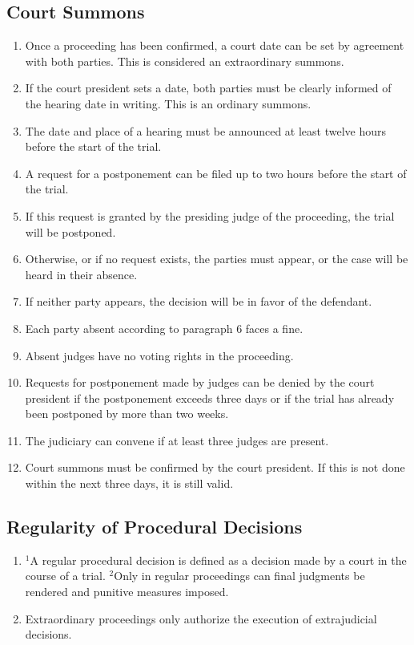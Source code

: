 \documentclass{article}
\begin{document}
\subsection{Court Summons}
\begin{enumerate}[(1)]
    \item Once a proceeding has been confirmed, a court date can be set by agreement with both parties. This is considered an extraordinary summons.
    \item If the court president sets a date, both parties must be clearly informed of the hearing date in writing. This is an ordinary summons.
    \item The date and place of a hearing must be announced at least twelve hours before the start of the trial.
    \item A request for a postponement can be filed up to two hours before the start of the trial.
    \item If this request is granted by the presiding judge of the proceeding, the trial will be postponed.
    \item Otherwise, or if no request exists, the parties must appear, or the case will be heard in their absence.
    \item If neither party appears, the decision will be in favor of the defendant.
    \item Each party absent according to paragraph 6 faces a fine.
    \item Absent judges have no voting rights in the proceeding.
    \item Requests for postponement made by judges can be denied by the court president if the postponement exceeds three days or if the trial has already been postponed by more than two weeks.
    \item The judiciary can convene if at least three judges are present.
    \item Court summons must be confirmed by the court president. If this is not done within the next three days, it is still valid.
\end{enumerate}

\subsection{Regularity of Procedural Decisions}
\begin{enumerate}[(1)]
    \item ${^1}$A regular procedural decision is defined as a decision made by a court in the course of a trial. ${^2}$Only in regular proceedings can final judgments be rendered and punitive measures imposed.
    \item Extraordinary proceedings only authorize the execution of extrajudicial decisions.
\end{enumerate}
\end{document}
